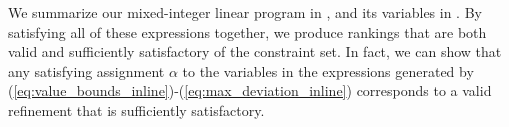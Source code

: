 We summarize our mixed-integer linear program in , and its variables in . %
By satisfying all of these expressions together, we produce rankings that are both valid and sufficiently satisfactory of the constraint set. In fact, we can show that any satisfying assignment $\alpha$ to the variables in the expressions generated by (\ref{eq:value_bounds_inline})-(\ref{eq:max_deviation_inline}) corresponds to a valid refinement that is sufficiently satisfactory.

